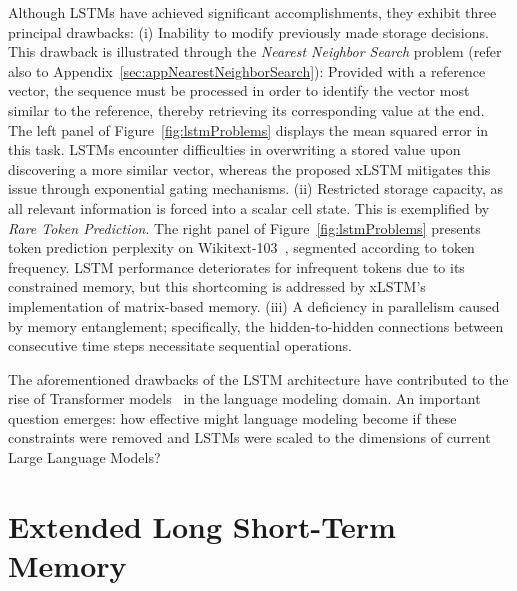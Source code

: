 Although LSTMs have achieved significant accomplishments, they exhibit three principal drawbacks: (i) Inability to modify previously made storage decisions. This drawback is illustrated through the {\it Nearest Neighbor Search} problem (refer also to Appendix~\ref{sec:appNearestNeighborSearch}): Provided with a reference vector, the sequence must be processed in order to identify the vector most similar to the reference, thereby retrieving its corresponding value at the end. The left panel of Figure~\ref{fig:lstmProblems} displays the mean squared error in this task. LSTMs encounter difficulties in overwriting a stored value upon discovering a more similar vector, whereas the proposed xLSTM mitigates this issue through exponential gating mechanisms. (ii) Restricted storage capacity, as all relevant information is forced into a scalar cell state. This is exemplified by {\it Rare Token Prediction}. The right panel of Figure~\ref{fig:lstmProblems} presents token prediction perplexity on Wikitext-103~\citep{Merity:17}, segmented according to token frequency. LSTM performance deteriorates for infrequent tokens due to its constrained memory, but this shortcoming is addressed by xLSTM’s implementation of matrix-based memory. (iii) A deficiency in parallelism caused by memory entanglement; specifically, the hidden-to-hidden connections between consecutive time steps necessitate sequential operations.

The aforementioned drawbacks of the LSTM architecture have contributed to the rise of Transformer models~\citep{Vaswani:17} in the language modeling domain. An important question emerges: how effective might language modeling become if these constraints were removed and LSTMs were scaled to the dimensions of current Large Language Models?

\section{Extended Long Short-Term Memory}
\label{sec:xLSTM}

